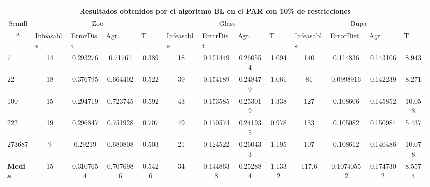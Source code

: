\begin{table}[H]
	\scriptsize

	\begin{adjustwidth}{-1cm}{-1cm}%
	
	\begin{tabular}{|l|c|c|c|c|c|c|c|c|c|c|c|c|}
	\hline
	\multicolumn{13}{|c|}{\textbf{Resultados obtenidos por el algoritmo BL en el PAR con 10\% de restricciones}}                                                                                                                                                                                                                                                                                                                                            \\ \hline
	\multicolumn{1}{|c|}{\multirow{2}{*}{Semilla}} & \multicolumn{4}{c|}{Zoo}                                                                                          & \multicolumn{4}{c|}{Glass}                                                                                         & \multicolumn{4}{c|}{Bupa}                                                                                          \\ \cline{2-13} 
	\multicolumn{1}{|c|}{}                                  & \multicolumn{1}{l|}{Infeasable} & \multicolumn{1}{l|}{ErrorDist} & \multicolumn{1}{l|}{Agr.} & \multicolumn{1}{l|}{T} & \multicolumn{1}{l|}{Infeasable} & \multicolumn{1}{l|}{ErrorDist} & \multicolumn{1}{l|}{Agr.} & \multicolumn{1}{l|}{T} & \multicolumn{1}{l|}{Infeasable} & \multicolumn{1}{l|}{ErrorDist} & \multicolumn{1}{l|}{Agr.} & \multicolumn{1}{l|}{T} \\ \hline
	7      & 14 & 0.293276 & 0.71761 & 0.389                     & 18 & 0.121449 & 0.260554 & 1.094 			 			& 140 & 0.114836 & 0.143106 & 8.943  \\ \hline
	22     & 18 & 0.376795 & 0.664402 & 0.522                    &	39 & 0.154189 & 0.248479 & 1.061					    & 81 & 0.0998916 & 0.142239 & 8.271		\\ \hline
	100    & 15 & 0.294719 & 0.723745 & 0.592		             &	43 & 0.153585 & 0.253019 & 1.338				        & 127 & 0.108606 & 0.145852 & 10.058		\\ \hline
	222    & 19 & 0.296847 & 0.751928 & 0.707                    &	49 & 0.170574 & 0.241935 & 0.978				        & 133 & 0.105082 & 0.150984 & 5.437 		\\ \hline
	273687 & 9 & 0.29219 & 0.680808 & 0.503                    &  	21 & 0.124522 & 0.260433 & 1.195				    & 107 & 0.108612 & 0.140486 & 10.078 \\ \hline
	\textbf{Media} & 15 & 0.3107654  & 0.7076986 & 0.5426 & 34 & 0.1448638 & 0.252884 & 1.1332 			& 117.6 & 0.10740552 & 0.1747302 & 8.5574                    \\ \hline
	\end{tabular}
	
	\end{adjustwidth}
	
\end{table}


